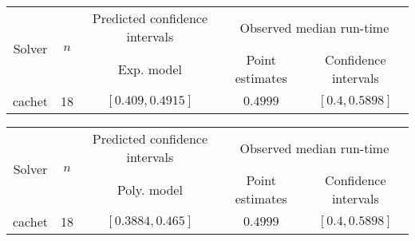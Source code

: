 \begin{tabular}{ccccc}
\hline 
\multirow{2}{*}{Solver} & \multirow{2}{*}{$n$} & Predicted confidence intervals & \multicolumn{2}{c}{Observed median  run-time}\tabularnewline
 &  & Exp. model  & Point estimates  & Confidence intervals\tabularnewline
\hline 
\hline 
\multirow{0}{*}{cachet} & 18 & $\mathbf{\left[0.409,0.4915\right]}$ & $0.4999$ & $\left[0.4,0.5898\right]$ \tabularnewline 
\hline 
\end{tabular} 

\begin{tabular}{ccccc}
\hline 
\multirow{2}{*}{Solver} & \multirow{2}{*}{$n$} & Predicted confidence intervals & \multicolumn{2}{c}{Observed median  run-time}\tabularnewline
 &  & Poly. model  & Point estimates  & Confidence intervals\tabularnewline
\hline 
\hline 
\multirow{0}{*}{cachet} & 18 & $\mathbf{\left[0.3884,0.465\right]}$ & $0.4999$ & $\left[0.4,0.5898\right]$ \tabularnewline 
\hline 
\end{tabular} 


